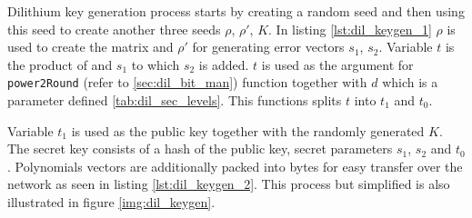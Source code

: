 Dilithium key generation process starts by creating a random seed and then using this seed to create another three seeds $\rho$, $\rho'$, $K$. In listing \ref{lst:dil_keygen_1} $\rho$ is used to create the matrix  and $\rho'$ for generating error vectors $s_1$, $s_2$. Variable $t$ is the product of  and $s_1$ to which $s_2$ is added. $t$ is used as the argument for \texttt{power2Round} (refer to \ref{sec:dil_bit_man}) function together with $d$ which is a parameter defined \ref{tab:dil_sec_levels}. This functions splits $t$ into $t_1$ and $t_0$.
\newpage
{}

Variable $t_1$ is used as the public key together with the randomly generated $K$. The secret key consists of a hash of the public key, secret parameters $s_1$, $s_2$ and $t_0$. Polynomials vectors are additionally packed into bytes for easy transfer over the network as seen in listing \ref{lst:dil_keygen_2}. This process but simplified is also illustrated in figure \ref{img:dil_keygen}.

